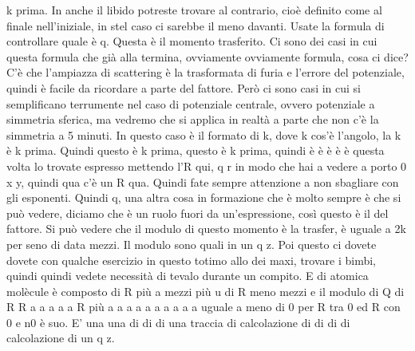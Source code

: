 \begin{soluzione}
{k prima. In anche il libido potreste trovare al contrario, cioè definito come al finale nell'iniziale, in stel caso ci sarebbe il meno davanti. Usate la formula di controllare quale è q. Questa è il momento trasferito. Ci sono dei casi in cui questa formula che già alla termina, ovviamente ovviamente formula, cosa ci dice? C'è che l'ampiazza di scattering è la trasformata di furia e l'errore del potenziale, quindi è facile da ricordare a parte del fattore. Però ci sono casi in cui si semplificano terrumente nel caso di potenziale centrale, ovvero potenziale a simmetria sferica, ma vedremo che si applica in realtà a parte che non c'è la simmetria a 5 minuti. In questo caso è il formato di k, dove k cos'è l'angolo, la k è k prima. Quindi questo è k prima, questo è k prima, quindi è è è è è questa volta lo trovate espresso mettendo l'R qui, q r in modo che hai a vedere a porto 0 x y, quindi qua c'è un R qua. Quindi fate sempre attenzione a non sbagliare con gli esponenti. Quindi q, una altra cosa in formazione che è molto sempre è che si può vedere, diciamo che è un ruolo fuori da un'espressione, così questo è il del fattore. Si può vedere che il modulo di questo momento è la trasfer, è uguale a 2k per seno di data mezzi. Il modulo sono quali in un q z. Poi questo ci dovete dovete con qualche esercizio in questo totimo allo dei maxi, trovare i bimbi, quindi quindi vedete necessità di tevalo durante un compito. E di atomica molècule è composto di R più a mezzi più u di R meno mezzi e il modulo di Q di R R a a a a a R più a a a a a a a a a a uguale a meno di 0 per R tra 0 ed R con 0 e n0 è suo. E' una una di di di una traccia di calcolazione di di di di calcolazione di un q z.

}
\end{soluzione}
